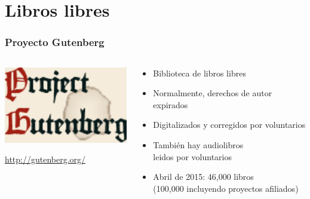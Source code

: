 %
%

\section{Libros libres}

\begin{frame}
\frametitle{Proyecto Gutenberg}

\begin{columns}[T]
\begin{column}{.38\textwidth}
\includegraphics[width=5.5cm]{figs/gutenberg-logo}

\begin{flushright}
{\small
\url{http://gutenberg.org/}
}
\end{flushright}

\end{column}%
\hfill%
\begin{column}{.60\textwidth}
{\Large
\begin{itemize}
\item Biblioteca de libros libres
\item Normalmente, derechos de autor expirados
\item Digitalizados y corregidos por voluntarios
\item También hay audiolibros \\
  leidos por voluntarios
\item Abril de 2015: 46,000 libros \\
  (100,000 incluyendo proyectos afiliados)
\end{itemize}
}
\end{column}%
\end{columns}

\end{frame}

